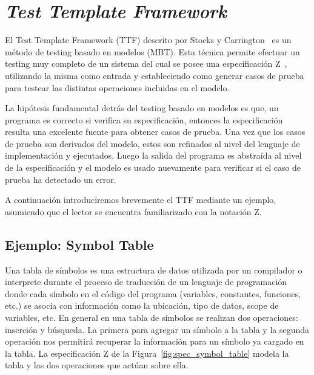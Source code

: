 \chapter{\emph{Test Template Framework}}

El Test Template Framework (TTF) descrito por Stocks y Carrington~\cite{stocks} es un método de testing basado en modelos (MBT). Esta técnica permite efectuar un testing muy completo de un sistema del cual se posee una especificación Z~\cite{spivey}, utilizando la misma como entrada y estableciendo como generar casos de prueba para testear las distintas operaciones incluidas en el modelo.

La hipótesis fundamental detrás del testing basado en modelos es que, un programa es correcto si verifica su especificación, entonces la especificación resulta una excelente fuente para obtener casos de prueba. Una vez que los casos de prueba son derivados del modelo, estos son refinados al nivel del lenguaje de implementación y ejecutados. Luego la salida del programa es abstraída al nivel de la especificación y el modelo es usado nuevamente para verificar si el caso de prueba ha detectado un error. 


A continuación introduciremos brevemente el TTF mediante un ejemplo, asumiendo que el lector se encuentra familiarizado con la notación Z.

\section{Ejemplo: Symbol Table}

Una tabla de símbolos es una estructura de datos utilizada por un compilador o interprete durante el proceso de traducción de un lenguaje de programación donde cada símbolo en el código del programa (variables, constantes, funciones, etc.) se asocia con información como la ubicación, tipo de datos, scope de variables, etc. 
En general en una tabla de símbolos se realizan dos operaciones: inserción y búsqueda. La primera para agregar un símbolo a la tabla y la segunda operación nos permitirá recuperar la información para un símbolo ya cargado en la tabla.
La especificación Z de la Figura~\ref{fig:spec_symbol_table} modela la tabla y las dos operaciones que actúan sobre ella.

